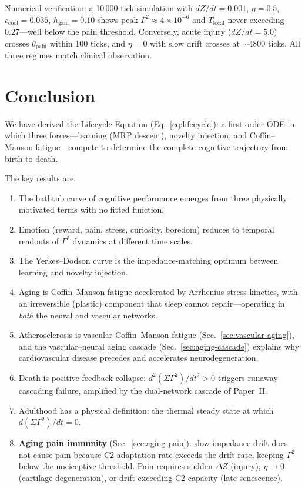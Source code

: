 ﻿\documentclass[aps,pre,twocolumn,superscriptaddress,floatfix]{revtex4-2}
\begin{document}
Numerical verification: a 10\,000-tick simulation with
$dZ/dt = 0.001$, $\eta = 0.5$, $c_{\text{cool}} = 0.035$,
$h_{\text{gain}} = 0.10$ shows peak $\Gamma^2 \approx 4 \times 10^{-6}$
and $T_{\text{local}}$ never exceeding $0.27$---well below
the pain threshold.
Conversely, acute injury ($dZ/dt = 5.0$) crosses
$\theta_{\text{pain}}$ within 100 ticks, and
$\eta = 0$ with slow drift crosses at $\sim$4800 ticks.
All three regimes match clinical observation.


\section{Conclusion}
\label{sec:conclusion}

We have derived the Lifecycle Equation
(Eq.~\eqref{eq:lifecycle}):
a first-order ODE in which three forces---learning
(MRP descent), novelty injection, and Coffin--Manson
fatigue---compete to determine the complete cognitive
trajectory from birth to death.

The key results are:
\begin{enumerate}
  \item The bathtub curve of cognitive performance
    emerges from three physically motivated terms
    with no fitted function.
  \item Emotion (reward, pain, stress, curiosity, boredom)
    reduces to temporal readouts of $\Gamma^2$ dynamics
    at different time scales.
  \item The Yerkes--Dodson curve is the impedance-matching
    optimum between learning and novelty injection.
  \item Aging is Coffin--Manson fatigue accelerated
    by Arrhenius stress kinetics, with an irreversible
    (plastic) component that sleep cannot repair---operating
    in \emph{both} the neural and vascular networks.
  \item Atherosclerosis is vascular Coffin--Manson fatigue
    (Sec.~\ref{sec:vascular-aging}), and the vascular--neural
    aging cascade (Sec.~\ref{sec:aging-cascade}) explains
    why cardiovascular disease precedes and accelerates
    neurodegeneration.
  \item Death is positive-feedback collapse:
    $d^2(\Sigma\Gamma^2)/dt^2 > 0$ triggers
    runaway cascading failure, amplified by the
    dual-network cascade of Paper~II.
  \item Adulthood has a physical definition:
    the thermal steady state at which
    $d(\Sigma\Gamma^2)/dt = 0$.
  \item \textbf{Aging pain immunity}
    (Sec.~\ref{sec:aging-pain}):
    slow impedance drift does not cause pain because
    C2 adaptation rate exceeds the drift rate, keeping
    $\Gamma^2$ below the nociceptive threshold.
    Pain requires sudden $\Delta Z$ (injury),
    $\eta \to 0$ (cartilage degeneration), or
    drift exceeding C2 capacity (late senescence).
\end{enumerate}
\end{document}
